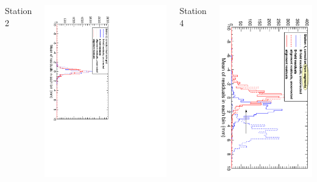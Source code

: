 \documentclass[compress]{beamer}
\begin{document}
\begin{frame}
\begin{columns}
Station 2

\includegraphics[height=\linewidth, angle=90]{new_grid_station2.pdf}

\vspace{1 cm}
Station 4

\includegraphics[height=\linewidth, angle=90]{scaling_corrections_station4.pdf}
\end{columns}
\end{frame}
\end{document}
